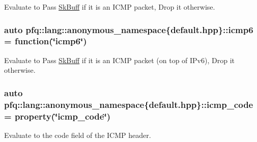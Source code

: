 Evaluate to {\ttfamily Pass} \hyperlink{structpfq_1_1lang_1_1SkBuff}{Sk\+Buff} if it is an I\+C\+MP packet, {\ttfamily Drop} it otherwise. 

\subsubsection[{\texorpdfstring{icmp6}{icmp6}}]{\setlength{\rightskip}{0pt plus 5cm}auto pfq\+::lang\+::anonymous\+\_\+namespace\{default.\+hpp\}\+::icmp6 = {\bf function}(\char`\"{}icmp6\char`\"{})}\hypertarget{namespacepfq_1_1lang_1_1anonymous__namespace_02default_8hpp_03_a8fda9498af823eec4f9f8d81d4a171d5}{}\label{namespacepfq_1_1lang_1_1anonymous__namespace_02default_8hpp_03_a8fda9498af823eec4f9f8d81d4a171d5}


Evaluate to {\ttfamily Pass} \hyperlink{structpfq_1_1lang_1_1SkBuff}{Sk\+Buff} if it is an I\+C\+MP packet (on top of I\+Pv6), {\ttfamily Drop} it otherwise. 

\subsubsection[{\texorpdfstring{icmp\+\_\+code}{icmp_code}}]{\setlength{\rightskip}{0pt plus 5cm}auto pfq\+::lang\+::anonymous\+\_\+namespace\{default.\+hpp\}\+::icmp\+\_\+code = {\bf property}(\char`\"{}icmp\+\_\+code\char`\"{})}\hypertarget{namespacepfq_1_1lang_1_1anonymous__namespace_02default_8hpp_03_a026262dd85de1db88a8303ed0f3dac18}{}\label{namespacepfq_1_1lang_1_1anonymous__namespace_02default_8hpp_03_a026262dd85de1db88a8303ed0f3dac18}


Evaluate to the {\ttfamily code} field of the I\+C\+MP header. 

